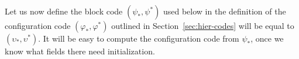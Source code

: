 \documentclass[11pt]{memoir}
\theoremstyle{definition} %
\newcommand{\PadLen}{\mathit{PadLen}} %
\begin{document}
Let us now define the block code \( (\psi_{*}, \psi^{*}) \) used below in the
definition of the configuration code \( (\varphi_{*}, \varphi^{*}) \)  
outlined in Section~\ref{sec:hier-codes} will be equal to \( (\upsilon_{*},\upsilon^{*}) \).
 It will be easy to compute the configuration code from \( \psi_{*} \),
once we know what fields there need initialization.






\end{document}
